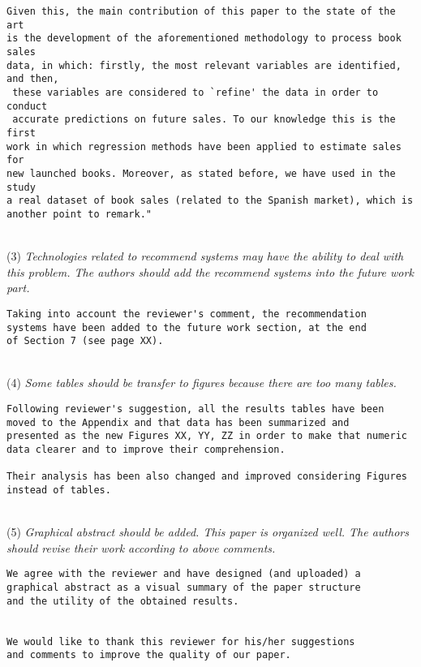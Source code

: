 \documentclass[preprint]{elsarticle}
\begin{document}
\begin{verbatim}
Given this, the main contribution of this paper to the state of the art 
is the development of the aforementioned methodology to process book sales 
data, in which: firstly, the most relevant variables are identified, and then,
 these variables are considered to `refine' the data in order to conduct
 accurate predictions on future sales. To our knowledge this is the first 
work in which regression methods have been applied to estimate sales for 
new launched books. Moreover, as stated before, we have used in the study 
a real dataset of book sales (related to the Spanish market), which is 
another point to remark."

\end{verbatim}


~\\
\noindent (3) \emph{Technologies related to recommend systems may have the ability to deal with this problem. The authors should add the recommend systems into the future work part. } 

\begin{verbatim}
Taking into account the reviewer's comment, the recommendation 
systems have been added to the future work section, at the end 
of Section 7 (see page XX).
\end{verbatim}


~\\
\noindent (4) \emph{Some tables should be transfer to figures because there are too many tables. } 

\begin{verbatim}
Following reviewer's suggestion, all the results tables have been 
moved to the Appendix and that data has been summarized and 
presented as the new Figures XX, YY, ZZ in order to make that numeric 
data clearer and to improve their comprehension.

Their analysis has been also changed and improved considering Figures 
instead of tables.
\end{verbatim}


~\\
\noindent (5) \emph{Graphical abstract should be added. This paper is organized well. The authors should revise their work according to above comments. } 

\begin{verbatim}
We agree with the reviewer and have designed (and uploaded) a 
graphical abstract as a visual summary of the paper structure 
and the utility of the obtained results.


We would like to thank this reviewer for his/her suggestions 
and comments to improve the quality of our paper.
\end{verbatim}
\end{document}
